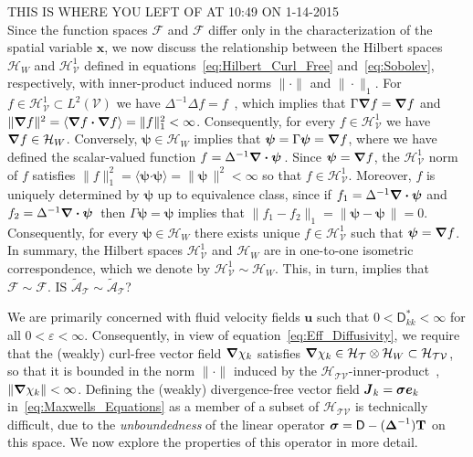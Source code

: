 \documentclass[leqno,onefignum,onetabnum]{siamltex1213}
\newcommand{\Tb}{\mathbf{T}}
\newcommand{\Tc}{\mathcal{T}}
\newcommand{\Vc}{\mathcal{V}}
\newcommand{\Hc}{\mathcal{H}}
\newcommand{\Fc}{\mathcal{F}}
\newcommand{\Ac}{\mathcal{A}}
\newcommand{\Dm}{\mathsf{D}}
\newcommand{\Hs}{\mathscr{H}}
\newcommand{\As}{\mathscr{A}}
\newcommand{\Fs}{\mathscr{F}}
\newcommand\bsig{\mbox{\boldmath${\sigma}$}}
\newcommand\bDelta{\mbox{\boldmath${\Delta}$}}
\newcommand\bnabla{\mbox{\boldmath${\nabla}$}}
\providecommand\bcdot{\boldsymbol{\cdot}}
\newcommand{\vecJ}{\boldsymbol{J}}
\newcommand{\vecx}{\boldsymbol{x}}
\newcommand{\vecu}{\boldsymbol{u}}
\newcommand{\vece}{\boldsymbol{e}}
\newcommand{\vecpsi}{\boldsymbol{\psi}}
\begin{document}
THIS IS WHERE YOU LEFT OF AT 10:49 ON 1-14-2015\\
Since the function spaces $\Fs$ and $\Fc$ differ
only in the characterization of the spatial variable $\vecx$, we now
discuss the relationship between the Hilbert spaces $\Hc_W$ and
$\Hs^1_{\Vc}$ defined in equations~\eqref{eq:Hilbert_Curl_Free}
and~\eqref{eq:Sobolev}, respectively, with inner-product induced norms 
$\|\cdot\|$ and $\|\cdot\|_1$. For $f\in\Hs^1_{\Vc}\subset L^2(\Vc)$ we have 
$\Delta^{-1}\Delta f=f$~\cite{Stakgold:BVP:2000}, which implies that
$\Gamma\bnabla f=\bnabla f$ and
$\|\bnabla f\|^2=\langle\bnabla f\bcdot\bnabla f\rangle=\|f\|_1^2<\infty$. Consequently, for every  
$f\in\Hs^1_{\Vc}$ we have $\bnabla f\in\Hc_W$. Conversely,
$\vecpsi\in\Hc_W$ implies that $\vecpsi=\Gamma\vecpsi=\bnabla f$, where
we have defined the scalar-valued function
$f=\Delta^{-1}\bnabla \bcdot\vecpsi\,$. Since $\vecpsi=\bnabla f$, the
$\Hs^1_{\Vc}$ norm of $f$ satisfies
$\|f\|_1^2=\langle\vecpsi\bcdot\vecpsi\rangle=\|\vecpsi\,\|^2<\infty$ so that
$f\in\Hs^1_{\Vc}$. Moreover, $f$ is uniquely determined by $\vecpsi$ up
to equivalence class, since if $f_1=\Delta^{-1}\bnabla \bcdot\vecpsi$ and
$f_2=\Delta^{-1}\bnabla \bcdot\vecpsi\,$ then $\Gamma\vecpsi=\vecpsi$ implies
that $\|f_1-f_2\|_1=\|\vecpsi-\vecpsi\,\|=0$. Consequently, for every  
$\vecpsi\in\Hc_W$ there exists unique $f\in\Hs^1_{\Vc}$ such that
$\vecpsi=\bnabla f$.  In summary, the Hilbert spaces $\Hs^1_{\Vc}$ and
$\Hc_W$ are in one-to-one isometric correspondence, which we denote by
$\Hs^1_{\Vc}\sim\Hc_W$. This, in turn, implies that $\Fs\sim\Fc$.  IS
$\tilde{\As}_{\Tc}\sim\tilde{\Ac}_{\Tc}$? 




\newpage
We are primarily concerned with fluid velocity fields $\vecu $ such
that $0<\Dm^*_{kk}<\infty$ for all $0<\varepsilon<\infty$. Consequently, in view of
equation~\eqref{eq:Eff_Diffusivity}, we require that the (weakly)
curl-free vector field $\bnabla \chi_k$ satisfies
$\bnabla \chi_k\in\Hc_{\Tc}\otimes\Hc_W\subset\Hc_{\Tc\Vc}$, so that it is
bounded in the norm $\|\cdot\|$ induced by the
$\Hc_{\Tc\Vc}$-inner-product~\cite{Folland:99:RealAnalysis}, $\|\bnabla
\chi_k\|<\infty$. Defining the (weakly) 
divergence-free vector field $\vecJ_k=\bsig\vece _k$
in~\eqref{eq:Maxwells_Equations} as a member of a subset of 
$\Hc_{\Tc\Vc}$ is technically difficult, due to the
\emph{unboundedness} of the linear operator
$\bsig=\Dm-(\bDelta^{-1})\Tb$ on this space. We now explore the
properties of this operator in more detail.  
\end{document}
